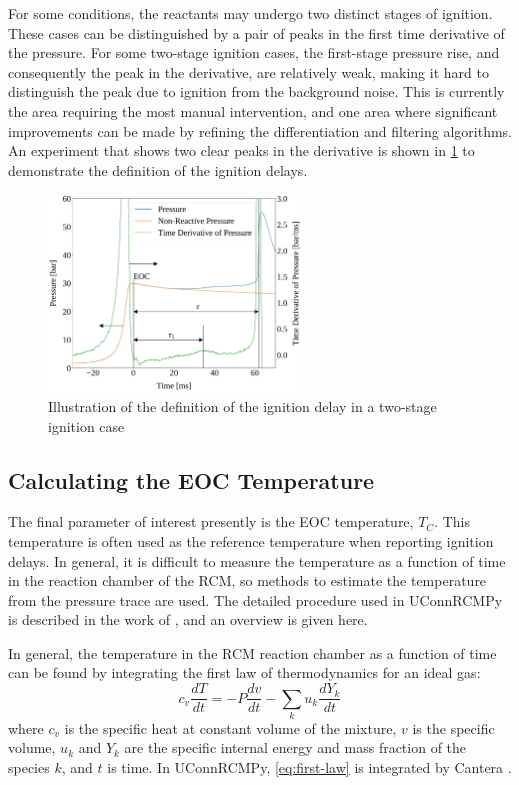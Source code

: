 \documentclass[12pt]{../ussci}
\begin{document}
For some conditions, the reactants may undergo two distinct stages of
ignition. These cases can be distinguished by a pair of peaks in the
first time derivative of the pressure. For some two-stage ignition
cases, the first-stage pressure rise, and consequently the peak in the
derivative, are relatively weak, making it hard to distinguish the peak
due to ignition from the background noise. This is currently the area
requiring the most manual intervention, and one area where significant
improvements can be made by refining the differentiation and
filtering algorithms. An experiment that shows two clear peaks
in the derivative is shown in \cref{fig:ign-delay-def} to
demonstrate the definition of the ignition delays.

\begin{figure}[htbp]
    \centering
    \includegraphics[width=0.6\textwidth]{figures/ign-delay-def.pdf}
    \caption{Illustration of the definition of the ignition delay in a
    two-stage ignition case}
    \label{fig:ign-delay-def}
\end{figure}

\subsection{Calculating the EOC Temperature}\label{calculating-the-eoc-temperature}

The final parameter of interest presently is the EOC temperature,
\(T_C\). This temperature is often used as the reference temperature
when reporting ignition delays. In general, it is difficult to measure
the temperature as a function of time in the reaction chamber of the
RCM, so methods to estimate the temperature from the pressure trace are
used. The detailed procedure used in UConnRCMPy is described in the work
of \textcite{Dames2016}, and an overview is given here.

In general, the temperature in the RCM reaction chamber as a function of
time can be found by integrating the first law of thermodynamics for an
ideal gas:
%
\begin{equation} \label{eq:first-law}
    c_v \frac{dT}{dt} = -P \frac{dv}{dt} - \sum_k u_k \frac{d Y_k}{dt}
\end{equation}
%
where \(c_v\) is the specific heat at constant volume of the mixture,
\(v\) is the specific volume, \(u_k\) and \(Y_k\) are the specific
internal energy and mass fraction of the species \(k\), and \(t\) is
time. In UConnRCMPy, \cref{eq:first-law} is integrated by Cantera
\autocite{cantera}.
\end{document}
